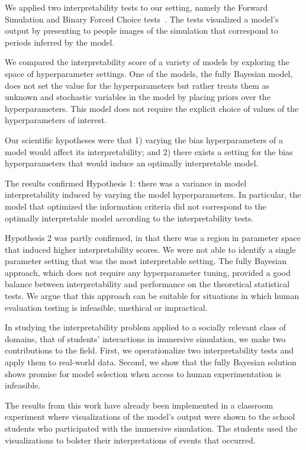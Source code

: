 \documentclass[letterpaper]{article}
\begin{document}
We applied two interpretability tests to our setting, namely the Forward Simulation and Binary Forced Choice tests~\cite{doshi2017roadmap}.
The tests visualized a model's output by presenting to people images of the simulation that correspond to periods inferred by the model.

We compared the interpretability score %
of a variety of models by exploring the space of hyperparameter settings.
One of the models, the fully Bayesian model, does not set the value for the hyperparameters but rather treats them as unknown and stochastic variables in the model by placing priors over the hyperparameters.
This model does not require the explicit choice of values of the hyperparameters of interest.

Our scientific hypotheses were that 1) varying the bias hyperparameters of a model would affect its interpretability; and 2) there exists a setting for the bias hyperparameters that would induce an optimally interpretable model.


The results confirmed Hypothesis 1: there was a variance in model interpretability induced by varying the model hyperparameters.
In particular, the model that optimized the information criteria did not correspond to the optimally interpretable model according to the interpretability tests.

Hypothesis 2 was partly confirmed, in that there was a region in parameter space that induced higher interpretability scores. We were not able to identify a single parameter setting that was the most interpretable setting.
The fully Bayesian approach, which does not require any hyperparameter tuning, provided a good balance between interpretability and performance on the theoretical statistical tests.
We argue that this approach can be suitable for situations in which human evaluation testing is infeasible, unethical or impractical.




In studying the interpretability problem applied to a socially relevant class of domains, that of students' interactions in immersive simulation, we make two contributions to the field.
First, we operationalize two interpretability tests and apply them to real-world data.
Second, we show that the fully Bayesian solution shows promise for model selection when access to human experimentation is infeasible.

The results from this work have already been implemented in a classroom experiment where visualizations of the model's output were shown to the school students who participated with the immersive simulation. The students used the visualizations to bolster their interpretations of events that occurred.
\end{document}
